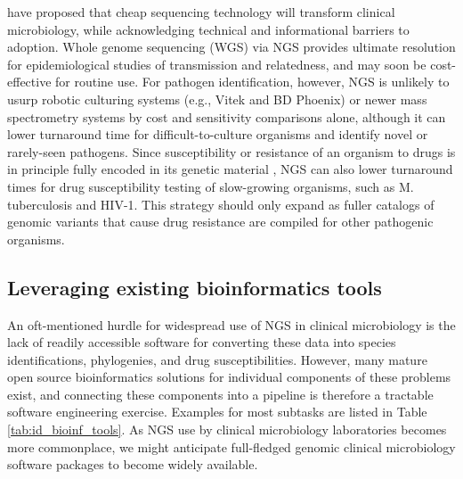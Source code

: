 \autocite{Didelot2012,Koser2012} have proposed that cheap sequencing technology will transform clinical microbiology, while acknowledging technical and informational barriers to adoption. Whole genome sequencing (WGS) via NGS provides ultimate resolution for epidemiological studies of transmission and relatedness, and may soon be cost-effective for routine use.\autocite{Didelot2012,Koser2012} For pathogen identification, however, NGS is unlikely to usurp robotic culturing systems (e.g., Vitek and BD Phoenix) or newer mass spectrometry systems by cost and sensitivity comparisons alone, although it can lower turnaround time for difficult-to-culture organisms and identify novel or rarely-seen pathogens.\autocite{Koser2012,Naccache2015} Since susceptibility or resistance of an organism to drugs is in principle fully encoded in its genetic material \autocite{Didelot2012,Gordon2014}, NGS can also lower turnaround times for drug susceptibility testing of slow-growing organisms, such as M. tuberculosis \autocite{Boehme2010} and HIV-1.\autocite{Ram2015} This strategy should only expand as fuller catalogs of genomic variants that cause drug resistance are compiled for other pathogenic organisms.

\subsection{Leveraging existing bioinformatics tools}

An oft-mentioned hurdle\autocite{Didelot2012,Koser2012} for widespread use of NGS in clinical microbiology is the lack of readily accessible software for converting these data into species identifications, phylogenies, and drug susceptibilities. However, many mature open source bioinformatics solutions for individual components of these problems exist, and connecting these components into a pipeline is therefore a tractable software engineering exercise. Examples for most subtasks are listed in Table \ref{tab:id_bioinf_tools}. As NGS use by clinical microbiology laboratories becomes more commonplace, we might anticipate full-fledged genomic clinical microbiology software packages to become widely available.

